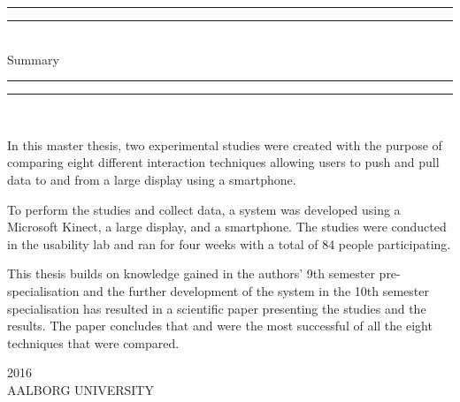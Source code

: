 \begin{dummy}

	\textheight
	\centering
	\vspace*{\baselineskip}
	\rule{\textwidth}{2pt}\vspace*{-\baselineskip}\vspace*{2pt}
	\rule{\textwidth}{0.4pt}\\[\baselineskip]
	{\LARGE Summary}\\[0.2\baselineskip]
	\rule{\textwidth}{0.4pt}\vspace*{-\baselineskip}\vspace{3.2pt}
	\rule{\textwidth}{2pt}\\[\baselineskip]
	\scshape
	{} \par
	\vspace*{2\baselineskip}
	\vspace*{2\baselineskip}

\begin{summary}
In this master thesis, two experimental studies were created with the purpose of comparing eight different interaction techniques allowing users to push and pull data to and from a large display using a smartphone.

To perform the studies and collect data, a system was developed using a Microsoft Kinect, a large display, and a smartphone.
The studies were conducted in the usability lab and ran for four weeks with a total of 84 people participating. 

This thesis builds on knowledge gained in the authors' 9th semester pre-specialisation and the further development of the system in the 10th semester specialisation has resulted in a scientific paper presenting the studies and the results.
The paper concludes that \swipe and \throw were the most successful of all the eight techniques that were compared.
\end{summary}
	\vspace*{2\baselineskip}
		{\scshape 2016} \\
		{\large AALBORG UNIVERSITY}\par
	
\end{dummy}